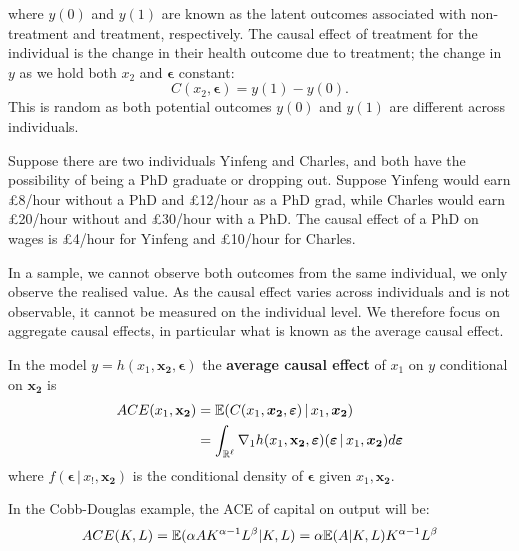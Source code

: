 \documentclass[DIV=14,titlepage=false]{scrreprt}
\begin{document}
where \( y(0) \) and \( y(1) \) are known as the latent outcomes associated with non-treatment and treatment, respectively. The causal effect of treatment for the individual is the change in their health outcome due to treatment; the change in \( y \) as we hold both \( x_2 \) and \( \boldsymbol{\epsilon} \) constant:
\[
C(x_2, \boldsymbol{\epsilon}) = y(1) - y(0).
\]
This is random as both potential outcomes \( y(0) \) and \( y(1) \) are different across individuals. 

\begin{example}
    Suppose there are two individuals Yinfeng and Charles, and both have the possibility of being a PhD graduate or dropping out. Suppose Yinfeng would earn £8/hour without a PhD and £12/hour as a PhD grad, while Charles would earn £20/hour without and £30/hour with a PhD. The causal effect of a PhD on wages is £4/hour for Yinfeng and £10/hour for Charles.
\end{example}

In a sample, we cannot observe both outcomes from the same individual, we only observe the realised value. As the causal effect varies across individuals and is not observable, it cannot be measured on the individual level. We therefore focus on aggregate causal effects, in particular what is known as the average causal effect.

\begin{definition}
    In the model $y = h(x_1, \mathbf{x_2},\boldsymbol{\epsilon})$ the \textbf{average causal effect} of $x_1$ on $y$ conditional on $\mathbf{x_2}$ is 
    \begin{align*}
        ACE(x_1, \mathbf{x_2}) &= \mathbb{E}(C(x_1, \boldsymbol{x_2}, \boldsymbol{\varepsilon}) \, | \, x_1, \boldsymbol{x_2}) \\
       &= \int_{\mathbb{R}^{\ell}} \nabla_1 h(x_1, \mathbf{x_2},\boldsymbol{\varepsilon}) (\boldsymbol{\varepsilon} \, | \,x_1, \boldsymbol{x_2}) d\boldsymbol{\varepsilon}    
    \end{align*}
        where $f(\boldsymbol{\epsilon} \, | \, x_!, \boldsymbol{x_2})$ is the conditional density of $\boldsymbol{\epsilon}$ given $x_1, \boldsymbol{x_2}$.
\end{definition}

\begin{example}

In the Cobb-Douglas example, the ACE of capital on output will be:
\[ ACE(K,L)=\mathbb{E}(\alpha AK^{\alpha-1}L^{\beta}|K,L)=\alpha \mathbb{E}(A|K,L)K^{\alpha -1}L^{\beta} \]

\end{example}
\end{document}
